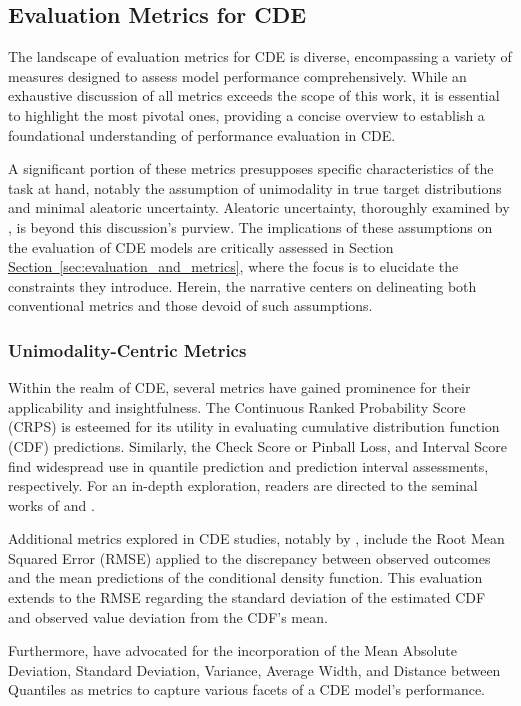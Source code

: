 \documentclass{article}
\newcommand\pef[1]{\hyperref[#1]{Section~\ref{#1}}}
\begin{document}
\subsection{Evaluation Metrics for CDE}
The landscape of evaluation metrics for CDE is diverse, encompassing a variety of measures designed to assess model performance comprehensively. While an exhaustive discussion of all metrics exceeds the scope of this work, it is essential to highlight the most pivotal ones, providing a concise overview to establish a foundational understanding of performance evaluation in CDE.

A significant portion of these metrics presupposes specific characteristics of the task at hand, notably the assumption of unimodality in true target distributions and minimal aleatoric uncertainty. Aleatoric uncertainty, thoroughly examined by \citep{hullermeier_aleatoric_2021}, is beyond this discussion's purview. The implications of these assumptions on the evaluation of CDE models are critically assessed in Section \pef{sec:evaluation_and_metrics}, where the focus is to elucidate the constraints they introduce. Herein, the narrative centers on delineating both conventional metrics and those devoid of such assumptions.

\subsubsection{Unimodality-Centric Metrics}

Within the realm of CDE, several metrics have gained prominence for their applicability and insightfulness. The Continuous Ranked Probability Score (CRPS) is esteemed for its utility in evaluating cumulative distribution function (CDF) predictions. Similarly, the Check Score or Pinball Loss, and Interval Score find widespread use in quantile prediction and prediction interval assessments, respectively. For an in-depth exploration, readers are directed to the seminal works of \citep{gneiting2007strictly} and \citep{selten1998axiomatic}.

Additional metrics explored in CDE studies, notably by \citep{rothfuss2019conditional}, include the Root Mean Squared Error (RMSE) applied to the discrepancy between observed outcomes and the mean predictions of the conditional density function. This evaluation extends to the RMSE regarding the standard deviation of the estimated CDF and observed value deviation from the CDF's mean.

Furthermore, \citep{klotz2021uncertainty} have advocated for the incorporation of the Mean Absolute Deviation, Standard Deviation, Variance, Average Width, and Distance between Quantiles as metrics to capture various facets of a CDE model's performance.
\end{document}
